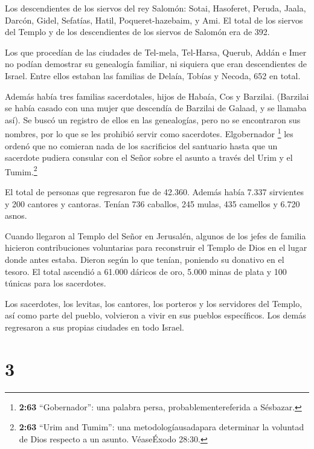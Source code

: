  Los descendientes de los siervos del rey Salomón: Sotai,
Hasoferet, Peruda,  Jaala, Darcón, Gidel, 
Sefatías, Hatil, Poqueret-hazebaim, y Ami.  El total de los
siervos del Templo y de los descendientes de los siervos de Salomón era
de 392.

 Los que procedían de las ciudades de Tel-mela, Tel-Harsa,
Querub, Addán e Imer no podían demostrar su genealogía familiar, ni
siquiera que eran descendientes de Israel.  Entre ellos
estaban las familias de Delaía, Tobías y Necoda, 652 en total.

 Además había tres familias sacerdotales, hijos de Habaía,
Cos y Barzilai. (Barzilai se había casado con una mujer que descendía de
Barzilai de Galaad, y se llamaba así).  Se buscó un
registro de ellos en las genealogías, pero no se encontraron sus
nombres, por lo que se les prohibió servir como sacerdotes.
 Elgobernador \footnote{\textbf{2:63} ``Gobernador'': una
  palabra persa, probablementereferida a Sésbazar.} les ordenó que no
comieran nada de los sacrificios del santuario hasta que un sacerdote
pudiera consular con el Señor sobre el asunto a través del Urim y el
Tumim.\footnote{\textbf{2:63} ``Urim and Tumim'': una
  metodologíausadapara determinar la voluntad de Dios respecto a un
  asunto. VéaseÉxodo 28:30.}

 El total de personas que regresaron fue de 42.360.
 Además había 7.337 sirvientes y 200 cantores y cantoras.
 Tenían 736 caballos, 245 mulas,  435 camellos
y 6.720 asnos.

 Cuando llegaron al Templo del Señor en Jerusalén, algunos
de los jefes de familia hicieron contribuciones voluntarias para
reconstruir el Templo de Dios en el lugar donde antes estaba.
 Dieron según lo que tenían, poniendo su donativo en el
tesoro. El total ascendió a 61.000 dáricos de oro, 5.000 minas de plata
y 100 túnicas para los sacerdotes.

 Los sacerdotes, los levitas, los cantores, los porteros y
los servidores del Templo, así como parte del pueblo, volvieron a vivir
en sus pueblos específicos. Los demás regresaron a sus propias ciudades
en todo Israel.

\hypertarget{section-2}{%
\section{3}\label{section-2}}

